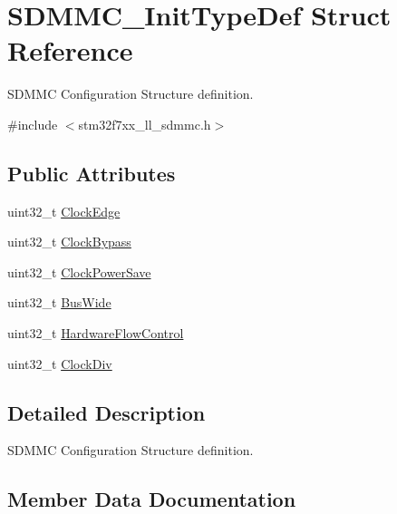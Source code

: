 \hypertarget{struct_s_d_m_m_c___init_type_def}{}\section{S\+D\+M\+M\+C\+\_\+\+Init\+Type\+Def Struct Reference}
\label{struct_s_d_m_m_c___init_type_def}


S\+D\+M\+MC Configuration Structure definition.  




{\ttfamily \#include $<$stm32f7xx\+\_\+ll\+\_\+sdmmc.\+h$>$}

\subsection*{Public Attributes}
\begin{DoxyCompactItemize}
\item 
uint32\+\_\+t \mbox{\hyperlink{struct_s_d_m_m_c___init_type_def_a999356b930b15af6c9ecf2c9eed89bb6}{Clock\+Edge}}
\item 
uint32\+\_\+t \mbox{\hyperlink{struct_s_d_m_m_c___init_type_def_a9283eaa673082cbb79274eabaf6ddbc9}{Clock\+Bypass}}
\item 
uint32\+\_\+t \mbox{\hyperlink{struct_s_d_m_m_c___init_type_def_a7336635628d6818a05abe74f92ca6323}{Clock\+Power\+Save}}
\item 
uint32\+\_\+t \mbox{\hyperlink{struct_s_d_m_m_c___init_type_def_a69c420db438efebc43156437f35c1502}{Bus\+Wide}}
\item 
uint32\+\_\+t \mbox{\hyperlink{struct_s_d_m_m_c___init_type_def_aa03b90f33a100609508a929e9fb2edc1}{Hardware\+Flow\+Control}}
\item 
uint32\+\_\+t \mbox{\hyperlink{struct_s_d_m_m_c___init_type_def_a8f3083375d977df0ecd41bb622a6e683}{Clock\+Div}}
\end{DoxyCompactItemize}


\subsection{Detailed Description}
S\+D\+M\+MC Configuration Structure definition. 



\subsection{Member Data Documentation}
\mbox{\label{struct_s_d_m_m_c___init_type_def_a69c420db438efebc43156437f35c1502}} 
